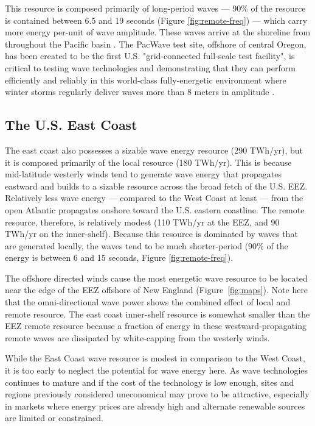 This resource is composed primarily of long-period waves — 90\% of the resource is contained between 6.5 and 19 seconds (Figure \ref{fig:remote-freq}) — which carry more energy per-unit of wave amplitude. These waves arrive at the shoreline from throughout the Pacific basin \citep{perezESTELAMethodEvaluating2014}. The PacWave test site, offshore of central Oregon, has been created to be the first U.S. "grid-connected full-scale test facility", is critical to testing wave technologies and demonstrating that they can perform efficiently and reliably in this world-class fully-energetic environment where winter storms regularly deliver waves more than 8 meters in amplitude \citep[e.g.][]{allan_climate_2006}.


\subsection{The U.S. East Coast}

The east coast also possesses a sizable wave energy resource (290 TWh/yr), but it is composed primarily of the local resource (180 TWh/yr). This is because mid-latitude westerly winds tend to generate wave energy that propagates eastward and builds to a sizable resource across the broad fetch of the U.S. EEZ. Relatively less wave energy — compared to the West Coast at least — from the open Atlantic propagates onshore toward the U.S. eastern coastline. The remote resource, therefore, is relatively modest (110 TWh/yr at the EEZ, and 90 TWh/yr on the inner-shelf). Because this resource is dominated by waves that are generated locally, the waves tend to be much shorter-period (90\% of the energy is between 6 and 15 seconds, Figure \ref{fig:remote-freq}).

The offshore directed winds cause the most energetic wave resource to be located near the edge of the EEZ offshore of New England (Figure~\ref{fig:maps}). Note here that the omni-directional wave power shows the combined effect of local and remote resource. The east coast inner-shelf resource is somewhat smaller than the EEZ remote resource because a fraction of energy in these westward-propagating remote waves are dissipated by white-capping from the westerly winds.

While the East Coast wave resource is modest in comparison to the West Coast, it is too early to neglect the potential for wave energy here. As wave technologies continues to mature and if the cost of the technology is low enough, sites and regions previously considered uneconomical may prove to be attractive, especially in markets where energy prices are already high and alternate renewable sources are limited or constrained. 

